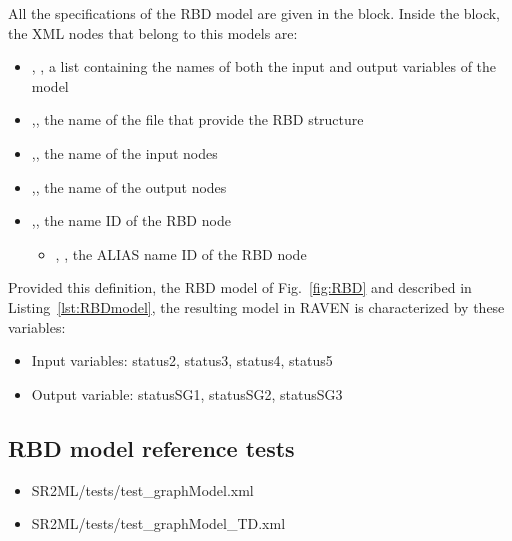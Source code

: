 All the specifications of the RBD model are given in the
 block.
Inside the  block, the XML
nodes that belong to this models are:
\begin{itemize}
  \item  {}, , a list containing the names of both the input and output variables of the model
  \item  {},, the name of the file that provide the RBD structure
  \item  {},, the name of the input nodes
  \item  {},, the name of the output nodes
  \item  {},, the name ID of the RBD node
	  \begin{itemize}
	    \item {}, , the ALIAS name ID of the RBD node
	  \end{itemize}
\end{itemize}

Provided this definition, the RBD model of Fig.~\ref{fig:RBD} and described in Listing~\ref{lst:RBDmodel},
the resulting model in RAVEN is characterized by these variables:
\begin{itemize}
	\item Input variables: status2, status3, status4, status5
	\item Output variable: statusSG1, statusSG2, statusSG3
\end{itemize}

\subsection{RBD model reference tests}
\begin{itemize}
	\item SR2ML/tests/test\_graphModel.xml
	\item SR2ML/tests/test\_graphModel\_TD.xml
\end{itemize}
